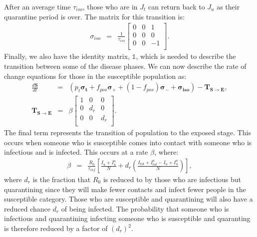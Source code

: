 \documentclass[notitlepage, superscriptaddress]{revtex4-2}
\begin{document}
After an average time $\tau_{iso}$, those who are in $J_{t}$ can return back to $J_{u}$ as their quarantine period is over. The matrix for this transition is:
\begin{eqnarray} 
\sigma_{iso} &=& \frac{1}{\tau_{iso}}
    \begin{bmatrix}
    0 & 0 & 1 \\ 
    0 & 0 & 0 \\
    0 & 0 & -1 \\
    \end{bmatrix}.
\end{eqnarray}
Finally, we also have the identity matrix, $\mathbb{1}$, which is needed to describe the transition between some of the disease phases. We can now describe the rate of change equations for those in the susceptible population as:
\begin{eqnarray} 
\frac{d \boldsymbol{S}}{dt} &=& \left( p_{t} \boldsymbol{\sigma_{t}} + f_{pos} \boldsymbol{\sigma_{+}} + (1-f_{pos}) \boldsymbol{\sigma_{-}} + \boldsymbol{\sigma_{iso}} \right) - \boldsymbol{T_{S \rightarrow E}}, \\
%
\boldsymbol{T_{S \rightarrow E}} &=& \beta
    \begin{bmatrix}
    1 & 0 & 0 \\ 
    0 & d_{r} & 0 \\
    0 & 0 & d_{r} \\
    \end{bmatrix}.
\end{eqnarray}
The final term represents the transition of population to the exposed stage. This occurs when someone who is susceptible comes into contact with someone who is infectious and is infected. This occurs at a rate $\beta$, where:
\begin{eqnarray}
\beta &=& \frac{R_{0}}{\tau_{inf}} \left[ \frac{I_{u} + I^{a}_{u}}{N} + d_{r} \left( \frac{I_{tot} + I^{a}_{tot} -I_{u} + I^{a}_{u}}{N} \right) \right],
\end{eqnarray}
where $d_{r}$ is the fraction that $R_{0}$ is reduced to by those who are infectious but quarantining since they will make fewer contacts and infect fewer people in the susceptible category. Those who are susceptible and quarantining will also have a reduced chance $d_{r}$ of being infected. The probability that someone who is infectious and quarantining infecting someone who is susceptible and quaranting is therefore reduced by a factor of $(d_{r})^{2}$.
\end{document}
